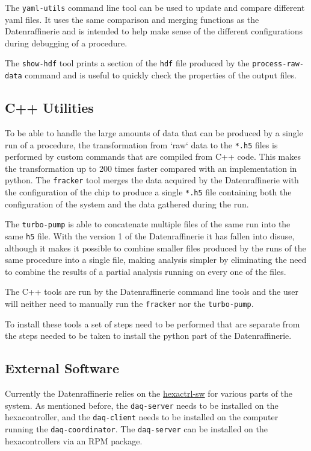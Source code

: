 \documentclass[11pt]{article}
\begin{document}
The \texttt{yaml-utils} command line tool can be used to update and compare different yaml files. It uses the same comparison and merging functions as the Datenraffinerie and is intended to help make sense of the different configurations during debugging of a procedure.

The \texttt{show-hdf} tool prints a section of the \texttt{hdf} file produced by the \texttt{process-raw-data} command and is useful to quickly check the properties of the output files.
\subsection{C++ Utilities}
To be able to handle the large amounts of data that can be produced by a single run of a procedure, the transformation from `raw` data to the \texttt{*.h5} files is performed by custom commands that are compiled from C++ code. This makes the transformation up to 200 times faster compared with an implementation in python.
The \texttt{fracker} tool merges the data acquired by the Datenraffinerie with the configuration of the chip to produce a single \texttt{*.h5} file containing both the configuration of the system and the data gathered during the run.

The \texttt{turbo-pump} is able to concatenate multiple files of the same run into the same \texttt{h5} file. With the version 1 of the Datenraffinerie it has fallen into disuse, although it makes it possible to combine smaller files produced by the runs of the same procedure into a single file, making analysis simpler by eliminating the need to combine the results of a partial analysis running on every one of the files.

The C++ tools are run by the Datenraffinerie command line tools and the user will neither need to manually run the \texttt{fracker} nor the \texttt{turbo-pump}.

To install these tools a set of steps need to be performed that are separate from the steps needed to be taken to install the python part of the Datenraffinerie.

\subsection{External Software}
Currently the Datenraffinerie relies on the \href{https://gitlab.cern.ch/hgcal-daq-sw/hexactrl-sw}{hexactrl-sw} for various parts of the system. As mentioned before, the \texttt{daq-server} needs to be installed on the hexacontroller, and the \texttt{daq-client} needs to be installed on the computer running the \texttt{daq-coordinator}. The \texttt{daq-server} can be installed on the hexacontrollers via an RPM package.
\end{document}
